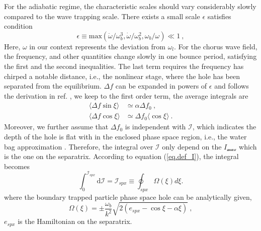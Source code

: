 For the adiabatic regime, the characteristic scales should vary considerably slowly compared to the wave trapping scale.
There exists a small scale $\epsilon$ satisfies condition \cite{berk1999}
\begin{equation}
    \epsilon \equiv \mathrm{max}\left(\ddot{ \omega}/\omega_b^3, \dot{\omega}/\omega_b^2, \omega_b/\omega \right) \ll 1~,
\end{equation}
Here, $\omega$ in our context represents the deviation from $\omega_l$.
For the chorus wave field, the frequency, and other quantities change slowly in one bounce period, satisfying the first and the second inequalities. The last term requires the frequency has chirped a notable distance, i.e., the nonlinear stage, where the hole has been separated from the equilibrium.
$\Delta f$ can be expanded in powers of $\epsilon$ and follows the derivation in ref. \cite{berk1999}, we keep to the first order term, the average integrals are
\begin{equation}
    \begin{aligned}
    \langle\Delta f \sin \xi \rangle &\simeq \alpha \Delta f_0 ~, \\ 
    \langle \Delta f \cos \xi \rangle &\simeq  \Delta f_0 \langle \cos \xi \rangle ~.
    \end{aligned}
\end{equation}
Moreover, we further assume that $\Delta f_0$ is independent with $\mathcal{I}$, which indicates the depth of the hole is flat with in the enclosed phase space region, i.e., the water bag approximation \cite{omura_theory_2008,hezaveh2021}. Therefore, the integral over $\mathcal{I}$ only depend on the $I_\mathcal{max}$ which is the one on the separatrix. 
According to equation (\ref{eq.def_I}), the integral becomes
\begin{equation}
    \int^{\mathcal{I}_{s p x}}_0 \mathrm{d}\mathcal{I} = \mathcal{I}_{s p x} \equiv \oint_{s p x} \Omega (\xi) d \xi.
\end{equation}
where the boundary trapped particle phase space hole can be analytically given,
\begin{equation}
    \Omega(\xi) = \pm \frac{\omega_b}{k^2} \sqrt{2 (e_{spx}-\cos \xi - \alpha \xi)}~,
\end{equation}
$e_{spx}$ is the Hamiltonian on the separatrix.

